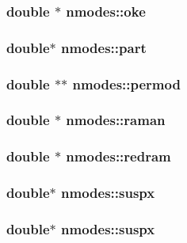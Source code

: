 \subsubsection{\setlength{\rightskip}{0pt plus 5cm}double $\ast$ {\bf nmodes::oke}}\label{structnmodes_7a8faaf09ca7b6b4954b5deaa5fa0805}


\subsubsection{\setlength{\rightskip}{0pt plus 5cm}double$\ast$ {\bf nmodes::part}}\label{structnmodes_43494e9d6f70bd745bb981657be3e074}


\subsubsection{\setlength{\rightskip}{0pt plus 5cm}double $\ast$$\ast$ {\bf nmodes::permod}}\label{structnmodes_61a670fe062807aec327469d3598fc50}


\subsubsection{\setlength{\rightskip}{0pt plus 5cm}double $\ast$ {\bf nmodes::raman}}\label{structnmodes_5ec6d6eaf6beda0cb2b69130907f1bd8}


\subsubsection{\setlength{\rightskip}{0pt plus 5cm}double $\ast$ {\bf nmodes::redram}}\label{structnmodes_bb42086e90690813be2370fe6633bda7}


\subsubsection{\setlength{\rightskip}{0pt plus 5cm}double$\ast$ {\bf nmodes::suspx}}\label{structnmodes_44b34974d16bcf2ce4a94ea6b2be4b3d}


\subsubsection{\setlength{\rightskip}{0pt plus 5cm}double$\ast$ {\bf nmodes::suspx}}\label{structnmodes_44b34974d16bcf2ce4a94ea6b2be4b3d}


